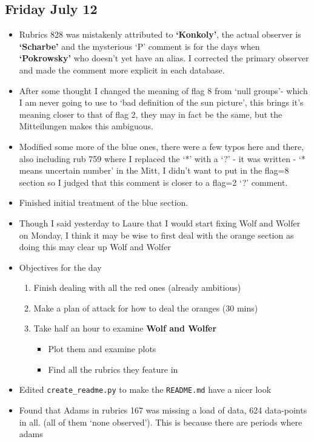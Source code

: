 \documentclass[12pt]{article}
\begin{document}
\subsection{Friday July 12}
\begin{itemize}
    \item Rubrics 828 was mistakenly attributed to \textbf{`Konkoly'}, the actual observer is \textbf{`Scharbe'} and the mysterious `P' comment is for the days when \textbf{`Pokrowsky'} who doesn't yet have an alias. I corrected the primary observer and made the comment more explicit in each database.
    \item After some thought I changed the meaning of flag 8 from `null groups'- which I am never going to use to `bad definition of the sun picture', this brings it's meaning closer to that of flag 2, they may in fact be the same, but the Mitteilungen makes this ambiguous.
    \item Modified some more of the blue ones, there were a few typos here and there, also including rub 759 where I replaced the `*' with a `?' - it was written - `* means uncertain number' in the Mitt, I didn't want to put in the flag=8 section so I judged that this comment is closer to a flag=2 `?' comment.
    \item Finished initial treatment of the blue section.
    \item Though I said yesterday to Laure that I would start fixing Wolf and Wolfer on Monday, I think it may be wise to first deal with the orange section as doing this may clear up Wolf and Wolfer 
    \item Objectives for the day
    \begin{enumerate}
        \item Finish dealing with all the red ones (already ambitious)
        \item Make a plan of attack for how to deal the oranges (30 mins)
        \item Take half an hour to examine \textbf{Wolf and Wolfer}
        \begin{itemize}
            \item Plot them and examine plots
            \item Find all the rubrics they feature in
        \end{itemize}
    \end{enumerate}
    \item Edited \texttt{create\_readme.py} to make the \texttt{README.md} have a nicer look
    \item Found that Adams in rubrics 167 was missing a load of data, 624 data-points in all. (all of them `none observed'). This is because there are periods where adams 

\end{itemize}
\end{document}

